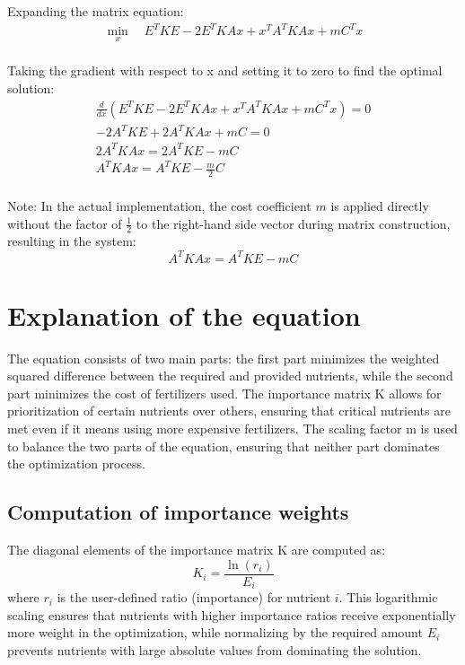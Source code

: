 \documentclass[12pt]{article}
\begin{document}
Expanding the matrix equation:
\begin{equation}
\begin{aligned}
\min_{x} \quad E^T K E - 2 E^T K A x + x^T A^T K A x + m C^T x \\ 
\end{aligned}
\end{equation}

Taking the gradient with respect to x and setting it to zero to find the optimal solution:
\begin{equation}
\begin{aligned}
\frac{d}{dx} \left( E^T K E - 2 E^T K A x + x^T A^T K A x + m C^T x \right) = 0 \\
-2 A^T K E + 2 A^T K A x + m C = 0 \\
2 A^T K A x = 2 A^T K E - m C \\
A^T K A x = A^T K E - \frac{m}{2} C \\
\end{aligned}
\end{equation}

Note: In the actual implementation, the cost coefficient $m$ is applied directly without the factor of $\frac{1}{2}$ to the right-hand side vector during matrix construction, resulting in the system:
\begin{equation}
A^T K A x = A^T K E - m C
\end{equation}

\section {Explanation of the equation}
The equation consists of two main parts: the first part minimizes the weighted squared difference between the required and provided nutrients, while the second part minimizes the cost of fertilizers used. The importance matrix K allows for prioritization of certain nutrients over others, ensuring that critical nutrients are met even if it means using more expensive fertilizers. The scaling factor m is used to balance the two parts of the equation, ensuring that neither part dominates the optimization process.

\subsection{Computation of importance weights}
The diagonal elements of the importance matrix K are computed as:
\begin{equation}
K_i = \frac{\ln(r_i)}{E_i}
\end{equation}
where $r_i$ is the user-defined ratio (importance) for nutrient $i$. This logarithmic scaling ensures that nutrients with higher importance ratios receive exponentially more weight in the optimization, while normalizing by the required amount $E_i$ prevents nutrients with large absolute values from dominating the solution.
\end{document}
